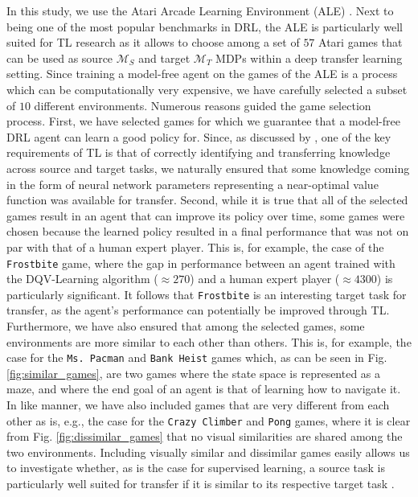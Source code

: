 In this study, we use the Atari Arcade Learning Environment (ALE) \cite{bellemare2013arcade}. Next to being one of the most popular benchmarks in DRL, the ALE is particularly well suited for TL research as it allows to choose among a set of $57$ Atari games that can be used as source $\mathcal{M}_S$ and target $\mathcal{M}_T$ MDPs within a deep transfer learning setting. Since training a model-free agent on the games of the ALE is a process which can be computationally very expensive, we have carefully selected a subset of $10$ different environments. Numerous reasons guided the game selection process. First, we have selected games for which we guarantee that a model-free DRL agent can learn a good policy for. Since, as discussed by \citet{lazaric2012transfer}, one of the key requirements of TL is that of correctly identifying and transferring knowledge across source and target tasks, we naturally ensured that some knowledge coming in the form of neural network parameters representing a near-optimal value function was available for transfer. Second, while it is true that all of the selected games result in an agent that can improve its policy over time, some games were chosen because the learned policy resulted in a final performance that was not on par with that of a human expert player. This is, for example, the case of the \texttt{Frostbite} game, where the gap in performance between an agent trained with the DQV-Learning algorithm \cite{sabatelli2018deepqv} ($\approx 270$) and a human expert player ($\approx 4300$) is particularly significant. It follows that \texttt{Frostbite} is an interesting target task for transfer, as the agent's performance can potentially be improved through TL. Furthermore, we have also ensured that among the selected games, some environments are more similar to each other than others. This is, for example, the case for the \texttt{Ms. Pacman} and \texttt{Bank Heist} games which, as can be seen in Fig. \ref{fig:similar_games}, are two games where the state space is represented as a maze, and where the end goal of an agent is that of learning how to navigate it. In like manner, we have also included games that are very different from each other as is, e.g., the case for the \texttt{Crazy Climber} and \texttt{Pong} games, where it is clear from Fig. \ref{fig:dissimilar_games} that no visual similarities are shared among the two environments. Including visually similar and dissimilar games easily allows us to investigate whether, as is the case for supervised learning, a source task is particularly well suited for transfer if it is similar to its respective target task \cite{mensink2021factors}. 

